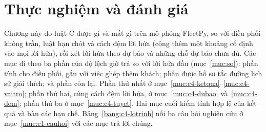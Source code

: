
\chapter{Thực nghiệm và đánh giá}
\label{chuong:thucnghiem}

Chương này đo luật C được gì và mất gì trên mô phỏng FleetPy, so với điều phối không trần, luật hạn chót và cách
đệm lời hứa (cộng thêm một khoảng cố định vào mọi lời hứa), rồi xét lời hứa theo dự báo và những chỗ dự báo chưa
đủ. Các mục đi theo ba phần của độ lệch giờ trả so với lời hứa đầu (mục~\ref{muc:so}): phần tính cho điều phối,
gắn với việc ghép thêm khách; phần được hồ sơ tắc đường lịch sử giải thích; và phần còn lại. Phần thứ nhất ở
mục~\ref{muc:c4-ketqua}--\ref{muc:c4-vaitro}; phần thứ hai, cùng cách đệm lời hứa, ở mục~\ref{muc:c4-dubao}
và~\ref{muc:c4-dem}; phần thứ ba ở mục~\ref{muc:c4-tuyet}. Hai mục cuối kiểm tính hợp lệ của kết quả và bàn các hạn
chế. Bảng~\ref{bang:c4-lotrinh} nối ba câu hỏi nghiên cứu ở mục~\ref{muc:c1-cauhoi} với các mục trả lời chúng.

